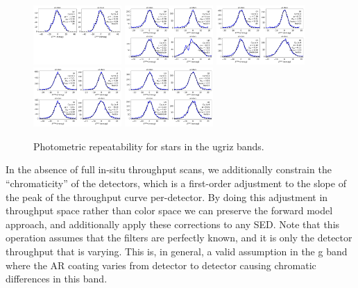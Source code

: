 \begin{figure}
  \begin{center}
    \includegraphics[width=0.3\textwidth]{photometric_calibration_figures/repeatability_u.png}
    \includegraphics[width=0.3\textwidth]{photometric_calibration_figures/repeatability_g.png}
    \includegraphics[width=0.3\textwidth]{photometric_calibration_figures/repeatability_r.png}
    \includegraphics[width=0.3\textwidth]{photometric_calibration_figures/repeatability_i.png}
    \includegraphics[width=0.3\textwidth]{photometric_calibration_figures/repeatability_z.png}
  \end{center}
  \caption{Photometric repeatability for stars in the ugriz bands.}
\end{figure}


In the absence of full in-situ throughput scans, we additionally constrain the
``chromaticity'' of the detectors, which is a first-order adjustment to the
slope of the peak of the throughput curve per-detector.  By doing this
adjustment in throughput space rather than color space we can preserve the
forward model approach, and additionally apply these corrections to any
SED. Note that this operation assumes that the filters are perfectly known, and
it is only the detector throughput that is varying.  This is, in general, a
valid assumption in the g band where the AR coating varies from detector to
detector causing chromatic differences in this band.

